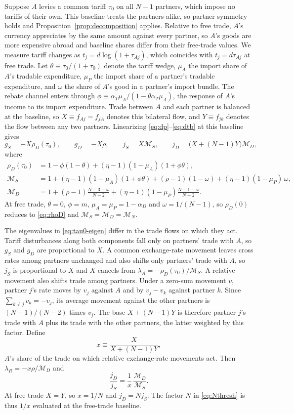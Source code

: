 \documentclass[11pt]{article}
\begin{document}
Suppose $A$ levies a common tariff $\tau_0$ on all $N-1$ partners, which impose no tariffs of their own. This baseline treats the partners alike, so partner symmetry holds and Proposition~\ref{prop:decomposition} applies. Relative to free trade, $A$'s currency appreciates by the same amount against every partner, so $A$'s goods are more expensive abroad and baseline shares differ from their free-trade values. We measure tariff changes as $t_j=d\log(1+\tau_{Aj})$, which coincides with $t_j=d\tau_{Aj}$ at free trade. Let $\theta\equiv\tau_0/(1+\tau_0)$ denote the tariff wedge, $\mu_A$ the import share of $A$'s tradable expenditure, $\mu_P$ the import share of a partner's tradable expenditure, and $\omega$ the share of $A$'s good in a partner's import bundle. The rebate channel enters through $\phi\equiv\alpha_T\mu_A/(1-\theta\alpha_T\mu_A)$, the response of $A$'s income to its import expenditure. Trade between $A$ and each partner is balanced at the baseline, so $X\equiv f_{Aj}=f_{jA}$ denotes this bilateral flow, and $Y\equiv f_{jk}$ denotes the flow between any two partners. Linearizing \eqref{eq:dp}--\eqref{eq:dtb} at this baseline gives
\begin{equation}
g_S=-X\rho_D(\tau_0),\qquad
g_D=-X\rho,\qquad
j_S=X\mathcal M_S,\qquad
j_D=\big(X+(N-1)Y\big)\mathcal M_D,
\label{eq:tau0-eigen}
\end{equation}
where
\begin{align*}
\rho_D(\tau_0)&=1-\phi(1-\theta)+(\eta-1)(1-\mu_A)(1+\phi\theta),\\
\mathcal M_S&=1+(\eta-1)(1-\mu_A)(1+\phi\theta)+(\rho-1)(1-\omega)+(\eta-1)(1-\mu_P)\,\omega,\\
\mathcal M_D&=1+(\rho-1)\frac{N-3+\omega}{N-2}+(\eta-1)(1-\mu_P)\frac{N-1-\omega}{N-2}.
\end{align*}
At free trade, $\theta=0$, $\phi=m$, $\mu_A=\mu_P=1-\alpha_D$ and $\omega=1/(N-1)$, so $\rho_D(0)$ reduces to \eqref{eq:rhoD} and $\mathcal M_S=\mathcal M_D=\mathcal M_N$.

The eigenvalues in \eqref{eq:tau0-eigen} differ in the trade flows on which they act. Tariff disturbances along both components fall only on partners' trade with $A$, so $g_S$ and $g_D$ are proportional to $X$. A common exchange-rate movement leaves cross rates among partners unchanged and also shifts only partners' trade with $A$, so $j_S$ is proportional to $X$ and $X$ cancels from $\lambda_A=-\rho_D(\tau_0)/\mathcal M_S$. A relative movement also shifts trade among partners. Under a zero-sum movement $v$, partner $j$'s rate moves by $v_j$ against $A$ and by $v_j-v_k$ against partner $k$. Since $\sum_{k\neq j}v_k=-v_j$, its average movement against the other partners is $(N-1)/(N-2)$ times $v_j$. The base $X+(N-1)Y$ is therefore partner $j$'s trade with $A$ plus its trade with the other partners, the latter weighted by this factor. Define
\[
x\equiv\frac{X}{X+(N-1)Y},
\]
$A$'s share of the trade on which relative exchange-rate movements act. Then $\lambda_R=-x\rho/\mathcal M_D$ and
\[
\frac{j_D}{j_S}=\frac1x\,\frac{\mathcal M_D}{\mathcal M_S}.
\]
At free trade $X=Y$, so $x=1/N$ and $j_D=Nj_S$. The factor $N$ in \eqref{eq:Nthresh} is thus $1/x$ evaluated at the free-trade baseline.
\end{document}
